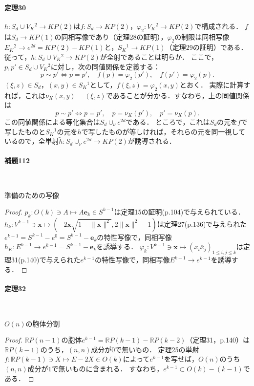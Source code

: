 \documentclass[a4paper, leqno]{ltjsreport}
\begin{document}
\paragraph{定理30}
$h\colon S_d \cup V_K{}^2 \to KP(2)$は$f\colon S_d \to KP(2)$，$\varphi_2\colon V_K{}^2 \to KP(2)$で構成される．
$f$は$S_d\to KP(1)$の同相写像であり（定理28の証明），$\varphi_2$の制限は同相写像$E_K{}^2\to e^{2d}=KP(2)-KP(1)$と，$S_K{}^1\to KP(1)$（定理29の証明）である．
従って，$h\colon S_d \cup V_K{}^2 \to KP(2)$が全射であることは明らか．
ここで，$p,p'\in S_d \cup V_K{}^2$に対し，次の同値関係を定義する：
\[p \sim p' \Leftrightarrow p = p', \quad f(p) = \varphi_2(p'), \quad f(p') = \varphi_2(p).\]
$(\xi, z) \in S_d$，$(x, y) \in S_K{}^1$として，$f(\xi, z) = \varphi_2(x, y)$とおく．
実際に計算すれば，これは$\nu_K(x, y) = (\xi, z)$であることが分かる．すなわち，上の同値関係は
\[p \sim p' \Leftrightarrow p = p', \quad p = \nu_K(p'), \quad p' = \nu_K(p).\]
この同値関係による等化集合は$S_d \cup_\nu e^{2d}$である．
ところで，これは$S_d$の元を$f$で写したものと$S_K{}^1$の元を$h$で写したものが等しければ，それらの元を同一視しているので，全単射$\tilde{h}\colon S_d \cup_\nu e^{2d} \to KP(2)$が誘導される．

\paragraph{補題112}~
\begin{screen}
  準備のための写像
\end{screen}
\begin{proof}
  $p_k\colon O(k) \ni A \mapsto A\boldsymbol{e}_k \in S^{k-1}$は定理15の証明(p.104)で与えられている．
  $h_k\colon V^{k-1} \ni \boldsymbol{x} \mapsto (-2\boldsymbol{x}\sqrt{1-\lVert\boldsymbol{x}\rVert^2}, 2\lVert\boldsymbol{x}\rVert^2 - 1)$は定理27(p.136)で与えられた$e^{k-1}=S^{k-1}-e^0=S^{k-1}-\boldsymbol{e}_k$の特性写像で，同相写像$h_K\colon E^{k-1}\to e^{k-1}=S^{k-1}-\boldsymbol{e}_k$を誘導する．
  $\varphi_k\colon V^{k-1} \ni \boldsymbol{x} \mapsto (x_i \overline{x}_j)_{1\leq i, j \leq k}$は定理31(p.140)で与えられた$e^{k-1}$の特性写像で，同相写像$E^{k-1}\to e^{k-1}$を誘導する．
\end{proof}

\paragraph{定理32}~
\begin{screen}
  $O(n)$の胞体分割
\end{screen}
\begin{proof}
  $\mathbb{R}P(n-1)$の胞体$e^{k-1} = \mathbb{R}P(k-1) - \mathbb{R}P(k-2)$（定理31，p.140）は$\mathbb{R}P(k-1)$のうち，$(n, n)$成分が$0$で無いもの．
  定理25の単射$f \colon \mathbb{R}P(k-1) \ni X \mapsto E-2X \in O(k)$によって$e^{k-1}$を写せば，$O(n)$のうち$(n, n)$成分が$1$で無いものに含まれる．
  すなわち，$e^{k-1} \subset O(k) - (k-1)$である．
\end{proof}
\end{document}
